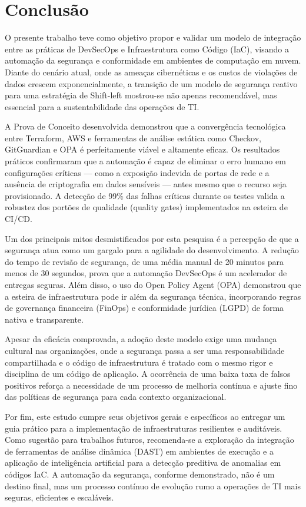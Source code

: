 \chapter{Conclusão}

O presente trabalho teve como objetivo propor e validar um modelo de integração entre as práticas de DevSecOps e Infraestrutura como Código (IaC), visando a automação da segurança e conformidade em ambientes de computação em nuvem. Diante do cenário atual, onde as ameaças cibernéticas e os custos de violações de dados crescem exponencialmente, a transição de um modelo de segurança reativo para uma estratégia de Shift-left mostrou-se não apenas recomendável, mas essencial para a sustentabilidade das operações de TI.

A Prova de Conceito desenvolvida demonstrou que a convergência tecnológica entre Terraform, AWS e ferramentas de análise estática como Checkov, GitGuardian e OPA é perfeitamente viável e altamente eficaz. Os resultados práticos confirmaram que a automação é capaz de eliminar o erro humano em configurações críticas — como a exposição indevida de portas de rede e a ausência de criptografia em dados sensíveis — antes mesmo que o recurso seja provisionado. A detecção de 99\% das falhas críticas durante os testes valida a robustez dos portões de qualidade (quality gates) implementados na esteira de CI/CD.

Um dos principais mitos desmistificados por esta pesquisa é a percepção de que a segurança atua como um gargalo para a agilidade do desenvolvimento. A redução do tempo de revisão de segurança, de uma média manual de 20 minutos para menos de 30 segundos, prova que a automação DevSecOps é um acelerador de entregas seguras. Além disso, o uso do Open Policy Agent (OPA) demonstrou que a esteira de infraestrutura pode ir além da segurança técnica, incorporando regras de governança financeira (FinOps) e conformidade jurídica (LGPD) de forma nativa e transparente.

Apesar da eficácia comprovada, a adoção deste modelo exige uma mudança cultural nas organizações, onde a segurança passa a ser uma responsabilidade compartilhada e o código de infraestrutura é tratado com o mesmo rigor e disciplina de um código de aplicação. A ocorrência de uma baixa taxa de falsos positivos reforça a necessidade de um processo de melhoria contínua e ajuste fino das políticas de segurança para cada contexto organizacional.

Por fim, este estudo cumpre seus objetivos gerais e específicos ao entregar um guia prático para a implementação de infraestruturas resilientes e auditáveis. Como sugestão para trabalhos futuros, recomenda-se a exploração da integração de ferramentas de análise dinâmica (DAST) em ambientes de execução e a aplicação de inteligência artificial para a detecção preditiva de anomalias em códigos IaC. A automação da segurança, conforme demonstrado, não é um destino final, mas um processo contínuo de evolução rumo a operações de TI mais seguras, eficientes e escaláveis.